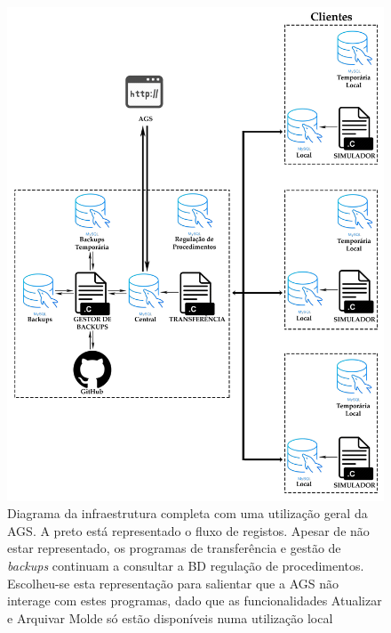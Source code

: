 \documentclass[11pt,twoside,a4paper]{report}
\begin{document}
\begin{figure}
	\vspace{-1cm}
	\begin{center}
		\includegraphics[width=1\textwidth]{Esquema_Projeto_Total02} %
		\caption[Diagrama da infraestrutura completa com uma utilização geral da aplicação de gestão do sistema]{Diagrama da infraestrutura completa com uma utilização geral da AGS. A preto está representado o fluxo de registos. Apesar de não estar representado, os programas de transferência e gestão de \textit{backups} continuam a consultar a BD regulação de procedimentos. Escolheu-se esta representação para salientar que a AGS não interage com estes programas, dado que as funcionalidades Atualizar e Arquivar Molde só estão disponíveis numa utilização local}
		\label{fig:infra_total2}
	\end{center}
\end{figure}
\end{document}
